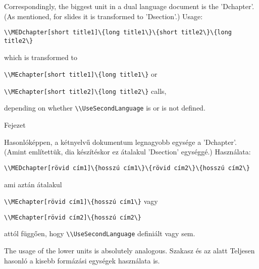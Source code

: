 {
Correspondingly, the biggest unit in a dual language document is the 'Dchapter'.
(As mentioned, for slides it is transformed to 'Dsection'.)
Usage:\par
\noindent\lstinline|\\MEDchapter[short title1]\{long title1\}\{short title2\}\{long title2\}|
\par\noindent which is transformed to
\par\noindent\lstinline|\\MEchapter[short title1]\{long title1\}| or
\par\noindent\lstinline|\\MEchapter[short title2]\{long title2\}| calls,
\par\noindent depending on whether \lstinline|\\UseSecondLanguage| is or is not defined.
}
{Fejezet}
{

Hasonlóképpen, a kétnyelvű dokumentum legnagyobb egysége a 'Dchapter'.
(Amint említettük, dia készítéskor ez átalakul 'Dsection' egységgé.)
Használata:\par
\noindent\lstinline|\\MEDchapter[rövid cím1]\{hosszú cím1\}\{rövid cím2\}\{hosszú cím2\}|
\par\noindent ami aztán átalakul 
\par\noindent\lstinline|\\MEchapter[rövid cím1]\{hosszú cím1\}| vagy
\par\noindent\lstinline|\\MEchapter[rövid cím2]\{hosszú cím2\}| 
\par\noindent attól függően, hogy  \lstinline|\\UseSecondLanguage| definiált vagy sem.
}



{
The usage of the lower units is absolutely analogous.
}
{Szakasz és az alatt}
{
Teljesen hasonló a kisebb formázási egységek használata is.
}


